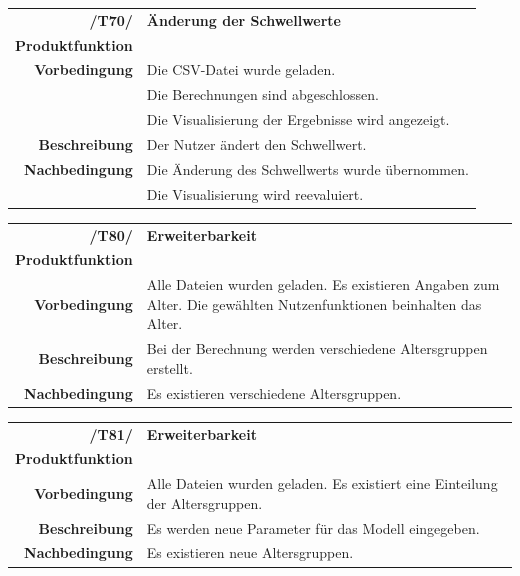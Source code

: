 \documentclass{article}
\begin{document}
\begin{table}[H]
\begin{tabularx}{\textwidth}{rX} \vspace{1mm}
\textbf{/T70/}         & \textbf{Änderung der Schwellwerte} \\ \vspace{1mm}
\textbf{Produktfunktion} & \nameref{sec:f:Schwellwerte konfigurieren} \\
\textbf{Vorbedingung}  & Die CSV-Datei wurde geladen. \\ & Die Berechnungen sind abgeschlossen. \\ \vspace{1mm} & Die Visualisierung der Ergebnisse wird angezeigt.\\ \vspace{1mm}
\textbf{Beschreibung}  & Der Nutzer ändert den Schwellwert. \\
\textbf{Nachbedingung} & Die Änderung des Schwellwerts wurde übernommen. \\ & Die Visualisierung wird reevaluiert.
\end{tabularx}
\end{table}

\begin{table}[H]
\begin{tabularx}{\textwidth}{rX} \vspace{1mm}
\textbf{/T80/}         & \textbf{Erweiterbarkeit} \\ \vspace{1mm}
\textbf{Produktfunktion} & \nameref{sec:f:Berechnung durchführen} \\
\textbf{Vorbedingung}  & Alle Dateien wurden geladen. Es existieren Angaben zum Alter. Die gewählten Nutzenfunktionen beinhalten das Alter. \\
\vspace{1mm}
\textbf{Beschreibung}  & Bei der Berechnung werden verschiedene Altersgruppen erstellt. \\
\textbf{Nachbedingung} & Es existieren verschiedene Altersgruppen.
\end{tabularx}
\end{table}

\begin{table}[H]
\begin{tabularx}{\textwidth}{rX} \vspace{1mm}
\textbf{/T81/}         & \textbf{Erweiterbarkeit} \\ \vspace{1mm}
\textbf{Produktfunktion} & \nameref{sec:f:Variation konfigurieren} \\
\textbf{Vorbedingung}  & Alle Dateien wurden geladen. Es existiert eine Einteilung der Altersgruppen. \\
\vspace{1mm}
\textbf{Beschreibung}  & Es werden neue Parameter für das Modell eingegeben. \\
\textbf{Nachbedingung} & Es existieren neue Altersgruppen.
\end{tabularx}
\end{table}
\end{document}
